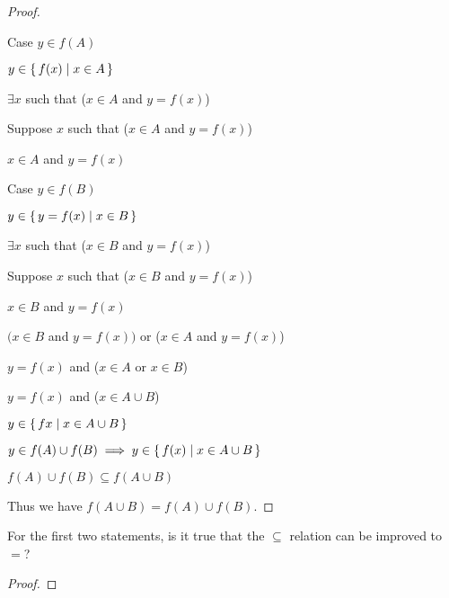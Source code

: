 \documentclass[../../main.tex]{subfiles}
\begin{document}
\begin{q}
\begin{enumerate}
\begin{proof}
\begin{lxl}
                \item Case $y \in f(A)$
                \begin{lxl}
                    \item $y \in \{\,f(x)\mid x \in A\,\}$ 
                    \item $\exists x$ such that ($x \in A$ and $y=f(x)$)
                    \item Suppose $x$ such that ($x \in A$ and $y=f(x)$) 
                    \begin{lxl}
                        \item $x \in A$ and $y=f(x)$
                    \end{lxl}
                \end{lxl}
                \item Case $y \in f(B)$
                \begin{lxl}
                    \item $y \in \{\,y=f(x)\mid x \in B\,\}$
                    \item $\exists x$ such that ($x \in B$ and $y=f(x)$)
                    \item Suppose $x$ such that ($x \in B$ and $y=f(x)$)
                    \begin{lxl}
                        \item $x \in B$ and $y=f(x)$
                    \end{lxl}
                \end{lxl}
                \item $(x \in B$ and $y=f(x))$ or ($x \in A$ and $y=f(x)$) 
                \item $y=f(x)$ and ($x \in A$ or $x \in B$) 
                \item $y=f(x)$ and ($x \in A \cup B$)
                \item $y \in \{\,f{x}\mid x \in A \cup B\,\}$
                \item $y \in f(A) \cup f(B) \implies y \in \{\,f(x)\mid x \in A \cup B\,\}$
                \item $f(A) \cup f(B) \subseteq f(A \cup B)$
            \end{lxl}
            Thus we have $f(A \cup B) = f(A) \cup f(B)$.
        \end{proof}
        
    \end{enumerate}
    For the first two statements, is it true that the $\subseteq$ relation can be improved to $=$?

    \begin{ans}
    
    \end{ans}
    \begin{proof}
        
    \end{proof}
\end{q}
\end{document}
